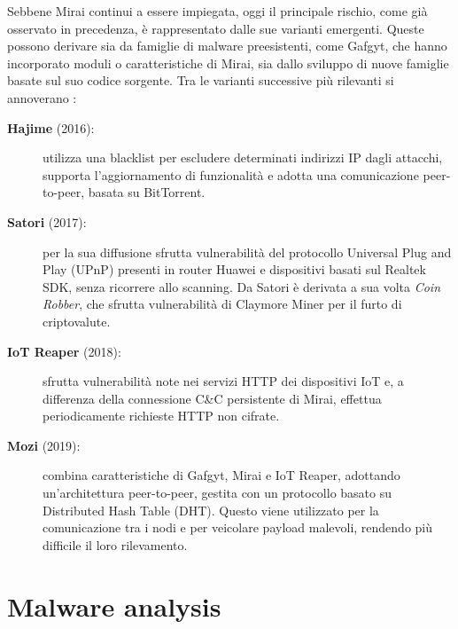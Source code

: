 Sebbene Mirai continui a essere impiegata, oggi il principale rischio, come già osservato in precedenza, è rappresentato dalle sue varianti emergenti. Queste possono derivare sia da famiglie di malware preesistenti, come Gafgyt, che hanno incorporato moduli o caratteristiche di Mirai, sia dallo sviluppo di nuove famiglie basate sul suo codice sorgente. Tra le varianti successive più rilevanti si annoverano \cite{hojun2024variant}:

\begin{description}
    \item[\textbf{Hajime} \normalfont(2016):] utilizza una blacklist per escludere determinati indirizzi IP dagli attacchi, supporta l'aggiornamento di funzionalità e adotta una comunicazione peer-to-peer, basata su BitTorrent.
    \item[\textbf{Satori} \normalfont(2017):] per la sua diffusione sfrutta vulnerabilità del protocollo Universal Plug and Play (UPnP) presenti in router Huawei e dispositivi basati sul Realtek SDK, senza ricorrere allo scanning. Da Satori è derivata a sua volta \emph{Coin Robber}, che sfrutta vulnerabilità di Claymore Miner per il furto di criptovalute.
    \item[\textbf{IoT Reaper} \normalfont(2018):] sfrutta vulnerabilità note nei servizi HTTP dei dispositivi IoT e, a differenza della connessione C\&C persistente di Mirai, effettua periodicamente richieste HTTP non cifrate. %
    \item[\textbf{Mozi} \normalfont(2019):] combina caratteristiche di Gafgyt, Mirai e IoT Reaper, adottando un'architettura peer-to-peer, gestita con un protocollo basato su Distributed Hash Table (DHT). Questo viene utilizzato per la comunicazione tra i nodi e per veicolare payload malevoli, rendendo più difficile il loro rilevamento.
\end{description}

\section{Malware analysis} %


